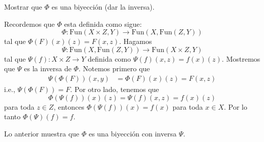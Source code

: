\begin{ejercicio}
    Mostrar que $\Phi$ es una biyección (dar la inversa).
\end{ejercicio}

\begin{demostracion}
    Recordemos que $\Phi$ esta definida como sigue: \begin{equation*}
        \Phi:\text{Fun}(X\times Z,Y)\to\text{Fun}(X,\text{Fun}(Z,Y))
    \end{equation*}
    tal que $\Phi(F)(x)(z)=F(x,z)$. Hagamos 
    \begin{equation*}
        \Psi:\text{Fun}(X,\text{Fun}(Z,Y))\to \text{Fun}(X\times Z,Y)
    \end{equation*}
    tal que $\Psi(f):X\times Z\to Y$ definida como $\Psi(f)(x,z)=f(x)(z)$. Mostremos que $\Psi$ es la inversa de $\Phi$. Notemos primero que 
    \begin{align*}
        \Psi(\Phi(F))(x,y)&=\Phi(F)(x)(z)=F(x,z)
    \end{align*}
    i.e., $ \Psi(\Phi(F))=F$. Por otro lado, tenemos que 
    \begin{equation*}
        \Phi(\Psi(f))(x)(z)=\Psi(f)(x,z)=f(x)(z)
    \end{equation*}
    para toda $z\in Z$, entonces $\Phi(\Psi(f))(x)=f(x)$ para toda $x\in X$. Por lo tanto $\Phi(\Psi)(f)=f$.

    Lo anterior muestra que $\Phi$ es una biyección con inversa $\Psi$.
\end{demostracion}
